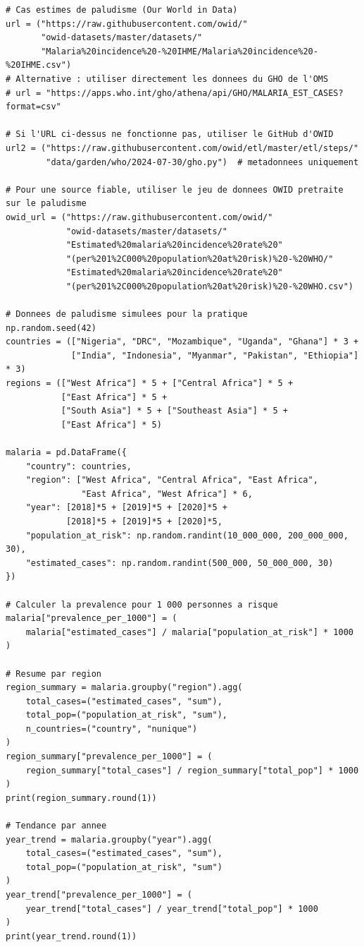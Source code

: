 \begin{verbatim}
# Cas estimes de paludisme (Our World in Data)
url = ("https://raw.githubusercontent.com/owid/"
       "owid-datasets/master/datasets/"
       "Malaria%20incidence%20-%20IHME/Malaria%20incidence%20-%20IHME.csv")
# Alternative : utiliser directement les donnees du GHO de l'OMS
# url = "https://apps.who.int/gho/athena/api/GHO/MALARIA_EST_CASES?format=csv"

# Si l'URL ci-dessus ne fonctionne pas, utiliser le GitHub d'OWID
url2 = ("https://raw.githubusercontent.com/owid/etl/master/etl/steps/"
        "data/garden/who/2024-07-30/gho.py")  # metadonnees uniquement

# Pour une source fiable, utiliser le jeu de donnees OWID pretraite sur le paludisme
owid_url = ("https://raw.githubusercontent.com/owid/"
            "owid-datasets/master/datasets/"
            "Estimated%20malaria%20incidence%20rate%20"
            "(per%201%2C000%20population%20at%20risk)%20-%20WHO/"
            "Estimated%20malaria%20incidence%20rate%20"
            "(per%201%2C000%20population%20at%20risk)%20-%20WHO.csv")

# Donnees de paludisme simulees pour la pratique
np.random.seed(42)
countries = (["Nigeria", "DRC", "Mozambique", "Uganda", "Ghana"] * 3 +
             ["India", "Indonesia", "Myanmar", "Pakistan", "Ethiopia"] * 3)
regions = (["West Africa"] * 5 + ["Central Africa"] * 5 +
           ["East Africa"] * 5 +
           ["South Asia"] * 5 + ["Southeast Asia"] * 5 +
           ["East Africa"] * 5)

malaria = pd.DataFrame({
    "country": countries,
    "region": ["West Africa", "Central Africa", "East Africa",
               "East Africa", "West Africa"] * 6,
    "year": [2018]*5 + [2019]*5 + [2020]*5 +
            [2018]*5 + [2019]*5 + [2020]*5,
    "population_at_risk": np.random.randint(10_000_000, 200_000_000, 30),
    "estimated_cases": np.random.randint(500_000, 50_000_000, 30)
})

# Calculer la prevalence pour 1 000 personnes a risque
malaria["prevalence_per_1000"] = (
    malaria["estimated_cases"] / malaria["population_at_risk"] * 1000
)

# Resume par region
region_summary = malaria.groupby("region").agg(
    total_cases=("estimated_cases", "sum"),
    total_pop=("population_at_risk", "sum"),
    n_countries=("country", "nunique")
)
region_summary["prevalence_per_1000"] = (
    region_summary["total_cases"] / region_summary["total_pop"] * 1000
)
print(region_summary.round(1))

# Tendance par annee
year_trend = malaria.groupby("year").agg(
    total_cases=("estimated_cases", "sum"),
    total_pop=("population_at_risk", "sum")
)
year_trend["prevalence_per_1000"] = (
    year_trend["total_cases"] / year_trend["total_pop"] * 1000
)
print(year_trend.round(1))
\end{verbatim}

